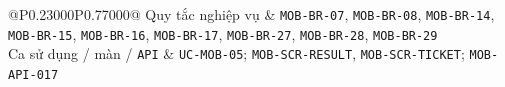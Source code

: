 \begin{longtable}{@{}P{0.23000\SRSWidth}P{0.77000\SRSWidth}@{}}
Quy tắc nghiệp vụ & \texttt{MOB-\allowbreak{}BR-\allowbreak{}07}, \texttt{MOB-\allowbreak{}BR-\allowbreak{}08}, \texttt{MOB-\allowbreak{}BR-\allowbreak{}14}, \texttt{MOB-\allowbreak{}BR-\allowbreak{}15}, \texttt{MOB-\allowbreak{}BR-\allowbreak{}16}, \texttt{MOB-\allowbreak{}BR-\allowbreak{}17}, \texttt{MOB-\allowbreak{}BR-\allowbreak{}27}, \texttt{MOB-\allowbreak{}BR-\allowbreak{}28}, \texttt{MOB-\allowbreak{}BR-\allowbreak{}29} \\[3pt]
Ca sử dụng /\allowbreak{} màn /\allowbreak{} \texttt{API} & \texttt{UC-\allowbreak{}MOB-\allowbreak{}05}; \texttt{MOB-\allowbreak{}SCR-\allowbreak{}RESULT}, \texttt{MOB-\allowbreak{}SCR-\allowbreak{}TICKET}; \texttt{MOB-\allowbreak{}API-\allowbreak{}017} \\[3pt]
\end{longtable}
\endgroup

